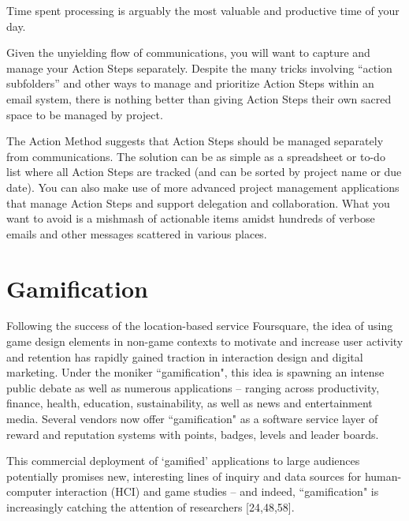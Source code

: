 Time spent processing is arguably the most valuable and productive time of your day.

Given the unyielding flow of communications, you will want to capture and manage your Action Steps separately. Despite the many tricks involving “action subfolders” and other ways to manage and prioritize Action Steps within an email system, there is nothing better than giving Action Steps their own sacred space to be managed by project.

The Action Method suggests that Action Steps should be managed separately from communications. The solution can be as simple as a spreadsheet or to-do list where all Action Steps are tracked (and can be sorted by project name or due date). You can also make use of more advanced project management applications that manage Action Steps and support delegation and collaboration. What you want to avoid is a mishmash of actionable items amidst hundreds of verbose emails and other messages scattered in various places.

\section{Gamification}

Following the success of the location-based service Foursquare, the idea of using game design elements in non-game contexts to motivate and increase user activity and retention has rapidly gained traction in interaction design and digital marketing. Under the moniker ``gamification", this idea is spawning an intense public debate as well as numerous applications – ranging across productivity, finance, health, education, sustainability, as well as news and entertainment media. Several vendors now offer ``gamification" as a software service layer of reward and reputation systems with points, badges, levels and leader boards.

This commercial deployment of `gamified' applications to large audiences potentially promises new, interesting lines of inquiry and data sources for human-computer interaction (HCI) and game studies – and indeed, ``gamification" is increasingly catching the attention of researchers [24,48,58].

